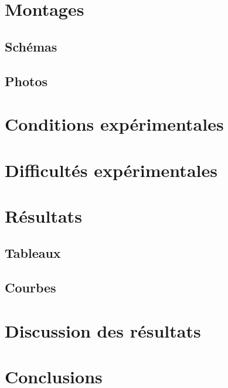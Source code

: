 \section*{Montages}

\subsection*{Schémas}

\subsection*{Photos}


\section*{Conditions expérimentales}


\section*{Difficultés expérimentales}


\section*{Résultats}

\subsection*{Tableaux}

\subsection*{Courbes}


\section*{Discussion des résultats}


\section*{Conclusions}

